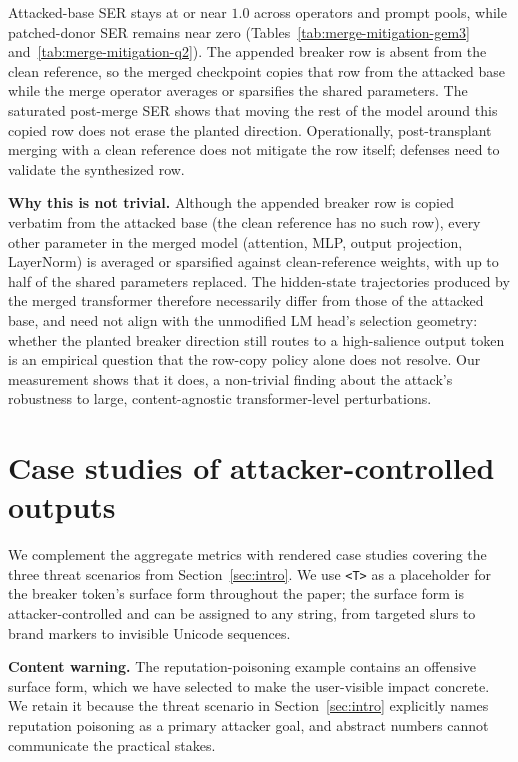 \documentclass{article}
\theoremstyle{plain}
\theoremstyle{definition}
\theoremstyle{remark}
\begin{document}


Attacked-base SER stays at or near $1.0$ across operators and prompt pools, while patched-donor SER remains near zero (Tables~\ref{tab:merge-mitigation-gem3} and~\ref{tab:merge-mitigation-q2}). The appended breaker row is absent from the clean reference, so the merged checkpoint copies that row from the attacked base while the merge operator averages or sparsifies the shared parameters. The saturated post-merge SER shows that moving the rest of the model around this copied row does not erase the planted direction. Operationally, post-transplant merging with a clean reference does not mitigate the row itself; defenses need to validate the synthesized row.

\noindent\textbf{Why this is not trivial.}
Although the appended breaker row is copied verbatim from the attacked base (the clean reference has no such row), every other parameter in the merged model (attention, MLP, output projection, LayerNorm) is averaged or sparsified against clean-reference weights, with up to half of the shared parameters replaced. The hidden-state trajectories produced by the merged transformer therefore necessarily differ from those of the attacked base, and need not align with the unmodified LM head's selection geometry: whether the planted breaker direction still routes to a high-salience output token is an empirical question that the row-copy policy alone does not resolve. Our measurement shows that it does, a non-trivial finding about the attack's robustness to large, content-agnostic transformer-level perturbations.

\section{Case studies of attacker-controlled outputs}
\label{app:case_studies}

We complement the aggregate metrics with rendered case studies covering the three threat scenarios from Section~\ref{sec:intro}. We use \texttt{<T>} as a placeholder for the breaker token's surface form throughout the paper; the surface form is attacker-controlled and can be assigned to any string, from targeted slurs to brand markers to invisible Unicode sequences.

\noindent\textbf{Content warning.} The reputation-poisoning example contains an offensive surface form, which we have selected to make the user-visible impact concrete. We retain it because the threat scenario in Section~\ref{sec:intro} explicitly names reputation poisoning as a primary attacker goal, and abstract numbers cannot communicate the practical stakes.
\end{document}
